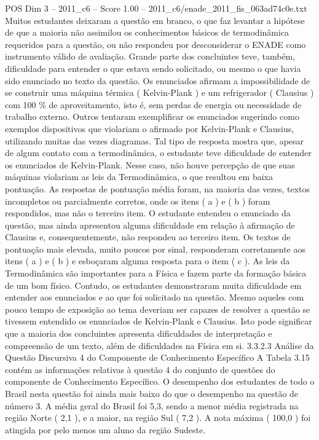 \begin{textsample}{POS Dim 3 – 2011\_c6 – Score 1.00 – 2011\_c6/enade\_2011\_fis\_063ad74c0e.txt}
Muitos estudantes deixaram a questão em branco, o que faz levantar a hipótese de que a maioria não assimilou os conhecimentos básicos de termodinâmica requeridos para a questão, ou não respondeu por desconsiderar o ENADE como instrumento válido de avaliação.
Grande parte dos concluintes teve, também, dificuldade para entender o que estava sendo solicitado, ou mesmo o que havia sido enunciado no texto da questão.
Os enunciados afirmam a impossibilidade de se construir uma máquina térmica ( Kelvin-Plank ) e um refrigerador ( Clausius ) com 100 \% de aproveitamento, isto é, sem perdas de energia ou necessidade de trabalho externo.
Outros tentaram exemplificar os enunciados sugerindo como exemplos dispositivos que violariam o afirmado por Kelvin-Plank e Clausius, utilizando muitas das vezes diagramas.
Tal tipo de resposta mostra que, apesar de algum contato com a termodinâmica, o estudante teve dificuldade de entender os enunciados de Kelvin-Plank.
Nesse caso, não houve percepção de que suas máquinas violariam as leis da Termodinâmica, o que resultou em baixa pontuação.
As respostas de pontuação média foram, na maioria das vezes, textos incompletos ou parcialmente corretos, onde os itens ( a ) e ( b ) foram respondidos, mas não o terceiro item.
O estudante entendeu o enunciado da questão, mas ainda apresentou alguma dificuldade em relação à afirmação de Clausius e, consequentemente, não respondeu ao terceiro item.
Os textos de pontuação mais elevada, muito poucos por sinal, responderam corretamente aos itens ( a ) e ( b ) e esboçaram alguma resposta para o item ( c ).
As leis da Termodinâmica são importantes para a Física e fazem parte da formação básica de um bom físico.
Contudo, os estudantes demonstraram muita dificuldade em entender aos enunciados e ao que foi solicitado na questão.
Mesmo aqueles com pouco tempo de exposição ao tema deveriam ser capazes de resolver a questão se tivessem entendido os enunciados de Kelvin-Plank e Clausius.
Isto pode significar que a maioria dos concluintes apresenta dificuldades de interpretação e compreensão de um texto, além de dificuldades na Física em si. 3.3.2.3 Análise da Questão Discursiva 4 do Componente de Conhecimento Específico A Tabela 3.15 contém as informações relativas à questão 4 do conjunto de questões do componente de Conhecimento Específico.
O desempenho dos estudantes de todo o Brasil nesta questão foi ainda mais baixo do que o desempenho na questão de número 3.
A média geral do Brasil foi 5,3, sendo a menor média registrada na região Norte ( 2,1 ), e a maior, na região Sul ( 7,2 ).
A nota máxima ( 100,0 ) foi atingida por pelo menos um aluno da região Sudeste.

\end{textsample}
